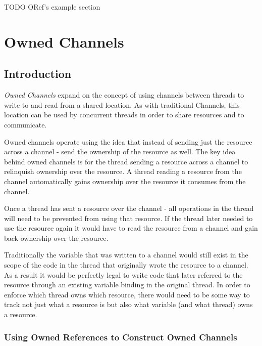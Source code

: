 \documentclass[onehalf,11pt]{beavtex}
\begin{document}
TODO ORef's example section


\chapter{Owned Channels}

\section{Introduction}

\textit{Owned Channels} expand on the concept of using channels between threads
to write to and read from a shared location.   As with traditional Channels,
this location can be used by concurrent threads in order to share resources and
to communicate.


Owned channels operate using the idea that instead of sending just the
resource across a channel - send the ownership of the resource as well.
The key idea behind owned channels is for the thread sending a
resource across a channel to relinquish ownership over the resource.
A thread reading a resource from the channel automatically gains ownership over
the resource it consumes from the channel.

Once a thread has sent a resource over the channel - all operations in the thread
will need to be prevented from using that resource.
If the thread later needed to use the resource again it would have to read the
resource from a channel and gain back ownership over the resource.

Traditionally the variable that was written to a channel would still exist in the
scope of the code in the thread that originally wrote the resource to a channel.
As a result it would be perfectly legal to write code that later referred to the
resource through an existing variable binding in the original thread.
In order to enforce which thread owns which resource, there would need to be
some way to track not just what a resource is but also what variable (and what
thread) owns a resource.

\subsection{Using Owned References to Construct Owned Channels}
\end{document}

